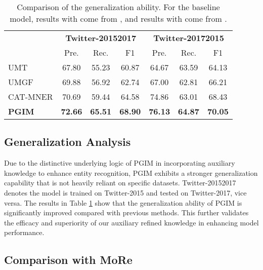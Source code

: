 \documentclass[11pt]{article}
\begin{document}
\begin{table}[t!]
\small
\setlength\tabcolsep{3pt}
\renewcommand{\arraystretch}{1.2}
\centering
\begin{tabular}{l|cccccc}
\toprule
& \multicolumn{3}{c|}{\textbf{Twitter-2015}\textbf{2017}}& \multicolumn{3}{c}{\textbf{Twitter-2017}\textbf{2015}}\\
& Pre. & Rec. & \multicolumn{1}{c|}{F1}  & Pre. & Rec. & \multicolumn{1}{c}{F1}    \\
\midrule
UMT     & 67.80  & 55.23 & \multicolumn{1}{c|}{60.87}  & 64.67  & 63.59 & 64.13  \\
UMGF     & 69.88 & 56.92 & \multicolumn{1}{c|}{62.74} & 67.00 & 62.81 & 66.21 \\
CAT-MNER  & 70.69 & 59.44 & \multicolumn{1}{c|}{64.58} & 74.86 & 63.01 & 68.43 \\
\textbf{PGIM}      & \textbf{72.66} & \textbf{65.51} & \multicolumn{1}{c|}{\textbf{68.90}} & \textbf{76.13} & \textbf{64.87} & \textbf{70.05} \\
\bottomrule
\end{tabular}
\caption{Comparison of the generalization ability. For the baseline model, results with  come from \citet{zhang2021multi}, and results with  come from \citet{wang2022cat}.  }
\label{tab:generalization ability}
\end{table}


\subsection{Generalization Analysis}
Due to the distinctive underlying logic of PGIM in incorporating auxiliary knowledge to enhance entity recognition, PGIM exhibits a stronger generalization capability that is not heavily reliant on specific datasets. Twitter-20152017 denotes the model is trained on Twitter-2015 and tested on Twitter-2017, vice versa. The results in Table \ref{tab:generalization ability} show that the generalization ability of PGIM is significantly improved compared with previous methods. This further validates the efficacy and superiority of our auxiliary refined knowledge in enhancing model performance.


\subsection{Comparison with MoRe}
\end{document}
